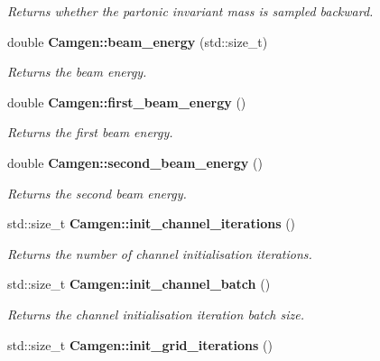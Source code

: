 \begin{DoxyCompactItemize}
\begin{DoxyCompactList}\small\item\em Returns whether the partonic invariant mass is sampled backward. \end{DoxyCompactList}\item 
\hypertarget{a00849_ad1362c10614d6c2848d4c93a443474bc}{double {\bfseries Camgen\-::beam\-\_\-energy} (std\-::size\-\_\-t)}\label{a00849_ad1362c10614d6c2848d4c93a443474bc}

\begin{DoxyCompactList}\small\item\em Returns the beam energy. \end{DoxyCompactList}\item 
\hypertarget{a00849_a7df898d0a648b1b85f8418ed1a5373c2}{double {\bfseries Camgen\-::first\-\_\-beam\-\_\-energy} ()}\label{a00849_a7df898d0a648b1b85f8418ed1a5373c2}

\begin{DoxyCompactList}\small\item\em Returns the first beam energy. \end{DoxyCompactList}\item 
\hypertarget{a00849_af8724feea3036bf30679759e8674ff86}{double {\bfseries Camgen\-::second\-\_\-beam\-\_\-energy} ()}\label{a00849_af8724feea3036bf30679759e8674ff86}

\begin{DoxyCompactList}\small\item\em Returns the second beam energy. \end{DoxyCompactList}\item 
\hypertarget{a00849_a4701d84b84d92950210c29d707d5ff19}{std\-::size\-\_\-t {\bfseries Camgen\-::init\-\_\-channel\-\_\-iterations} ()}\label{a00849_a4701d84b84d92950210c29d707d5ff19}

\begin{DoxyCompactList}\small\item\em Returns the number of channel initialisation iterations. \end{DoxyCompactList}\item 
\hypertarget{a00849_a909df520c28dcb343bb45c0484c18e33}{std\-::size\-\_\-t {\bfseries Camgen\-::init\-\_\-channel\-\_\-batch} ()}\label{a00849_a909df520c28dcb343bb45c0484c18e33}

\begin{DoxyCompactList}\small\item\em Returns the channel initialisation iteration batch size. \end{DoxyCompactList}\item 
\hypertarget{a00849_aec199dad2e3a981732f1b754ef780907}{std\-::size\-\_\-t {\bfseries Camgen\-::init\-\_\-grid\-\_\-iterations} ()}\label{a00849_aec199dad2e3a981732f1b754ef780907}


\end{DoxyCompactItemize}
